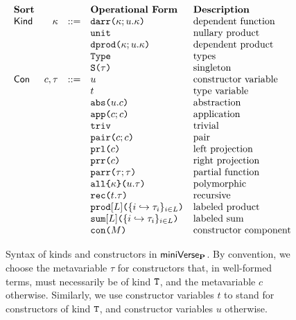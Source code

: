 \begin{figure}[p] 
\[\begin{array}{lrlllll}
\textbf{Sort} & & & \textbf{Operational Form} 
& \textbf{Description}\\
\mathsf{Kind} & \kappa & ::= & \texttt{darr}\texttt{(}\kappa; u.\kappa\texttt{)} 
& \text{dependent function}\\
&&& \texttt{unit} 
& \text{nullary product}\\
&&& \texttt{dprod}\texttt{(}\kappa; u.\kappa\texttt{)} 
& \text{dependent product}\\
&&& \texttt{Type} 
& \text{types}\\
&&& \texttt{S}\texttt{(}\tau\texttt{)} 
& \text{singleton}\\
\mathsf{Con} & c, \tau & ::= & u 
& \text{constructor variable}\\
&&& t 
& \text{type variable}
\\
&&& \texttt{abs}\texttt{(}u.c\texttt{)} 
& \text{abstraction}\\
&&& \texttt{app}\texttt{(}c; c\texttt{)} 
& \text{application}\\
&&& \texttt{triv} 
& \text{trivial}\\
&&& \texttt{pair}\texttt{(}c; c\texttt{)}
& \text{pair}\\
&&& \texttt{prl}\texttt{(}c\texttt{)} 
& \text{left projection}\\
&&& \texttt{prr}\texttt{(}c\texttt{)} 
& \text{right projection}\\
&&& \texttt{parr}\texttt{(}\tau; \tau\texttt{)} 
& \text{partial function}\\
&&& \texttt{all}\texttt{\{}\kappa\texttt{\}(}u.\tau\texttt{)} 
& \text{polymorphic}\\
&&& \texttt{rec}\texttt{(}t.\tau\texttt{)} 
& \text{recursive}\\
&&& \texttt{prod}[L]\texttt{(}\{i \hookrightarrow \tau_{i}\}_{i \in L}\texttt{)} 
& \text{labeled product}\\
&&& \texttt{sum}[L]\texttt{(}\{i \hookrightarrow \tau_{i}\}_{i \in L}\texttt{)} 
& \text{labeled sum}\\
&&& \texttt{con}\texttt{(}M\texttt{)} 
& \text{constructor component}
\end{array}\]
\caption[Syntax of kinds and constructors in $\miniVerseParam$]{Syntax of kinds and constructors in $\miniVerseParam$. By convention, we choose the metavariable $\tau$ for constructors that, in well-formed terms, must necessarily be of kind $\texttt{T}$, and the metavariable $c$ otherwise. Similarly, we use constructor variables $t$ to stand for constructors of kind $\texttt{T}$, and constructor variables $u$ otherwise.}
\label{fig:P-kinds-constructors}
\end{figure}

